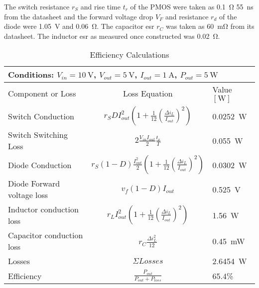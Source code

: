 The switch resistance $r_S$ and rise time $t_r$ of the PMOS were taken as \SI{0.1}{\ohm} \SI{55}{\nano\second} from the datasheet and the forward voltage drop $V_F$ and resistance $r_d$ of the diode were \SI{1.05}{\volt} and \SI{0.06}{\ohm}. The capacitor esr $r_C$ was taken as \SI{60}{\milli\ohm} from its datasheet. The inductor esr as measured once constructed was \SI{0.02}{\ohm}.
\begin{table}[h]
	\centering
	\caption{Efficiency Calculations}
	\begin{tabular}{lcl}
		\toprule
		\multicolumn{3}{l}{Conditions: $V_{in}=\SI{10}{\volt}$, $V_{out}=\SI{5}{\volt}$, $I_{out}=\SI{1}{\ampere}$, $P_{out}=\SI{5}{\watt}$}\\
		\midrule
		Component or Loss&Loss Equation&Value $\left[\si{\watt}\right]$\\
		\cmidrule(r){1-1}\cmidrule(lr){2-2}\cmidrule(l){3-3}
		Switch Conduction &  $r_{S}DI_{out}^2\left(1 + \frac{1}{12}\left(\frac{\Delta i_L}{I_{out}}\right)^2\right)$ & \SI{0.0252}{\watt} \\
		Switch Switching Loss & $2\frac{V_{in}I_{out}}{2}\frac{t_r}{T}$& \SI{0.055}{\watt}\\
		Diode Conduction & $r_{S}(1-D)\frac{I_{out}^2}{2}\left(1 + \frac{1}{12}\left(\frac{\Delta i_L}{I_{out}}\right)^2\right)$ & \SI{0.0302}{\watt}\\
		Diode Forward voltage loss & $v_f\left(1-D\right)I_{out}$ & \SI{0.525}{\volt} \\
		Inductor conduction loss & $r_L I_{out}^2\left(1 + \frac{1}{12}\left(\frac{\Delta i_L}{I_{out}}\right)^2\right)$ & \SI{1.56}{\watt}\\
		Capacitor conduction loss & $r_C\frac{\Delta i_L ^2}{12}$ & \SI{0.45}{\milli\watt}\\
		\midrule
		Losses & $\Sigma Losses$ & \SI{2.6454}{\watt}\\
		Efficiency & $\frac{P_{out}}{P_{out}+P_{loss}}$& 65.4\%\\
		\bottomrule
	\end{tabular}
	\label{tab:converter:efficiency calculations}
\end{table}